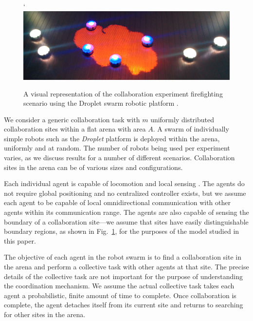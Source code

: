 \documentclass{TeXstyles/DARS/svmult}  %
\begin{document}
\begin{figure}[!htb]`
\centering\includegraphics[width=.98\textwidth]{figures/setup.png}
\centering\caption{A visual representation of the collaboration experiment firefighting scenario using the Droplet swarm robotic platform \cite{farrow14,klingner14}.}\label{fig:setup}
\end{figure}

We consider a generic collaboration task with $m$ uniformly distributed collaboration sites within a flat arena with area $A$. A swarm of individually simple robots such as the \emph{Droplet} platform \cite{farrow14,klingner14} is deployed within the arena, uniformly and at random. The number of robots being used per experiment varies, as we discuss results for a number of different scenarios. Collaboration sites in the arena can be of various sizes and configurations.

Each individual agent is capable of locomotion \cite{klingner14} and local sensing \cite{farrow14}. The agents do not require global positioning and no centralized controller exists, but we assume each agent to be capable of local omnidirectional communication with other agents within its communication range. The agents are also capable of sensing the boundary of a collaboration site---we assume that sites have easily distinguishable boundary regions, as shown in Fig.~\ref{fig:setup}, for the purposes of the model studied in this paper. 

The objective of each agent in the robot swarm is to find a collaboration site in the arena and perform a collective task with other agents at that site. The precise details of the collective task are not important for the purpose of understanding the coordination mechanism. We assume the actual collective task takes each agent a probabilistic, finite amount of time to complete. Once collaboration is complete, the agent detaches itself from its current site and returns to searching for other sites in the arena. 
\end{document}
